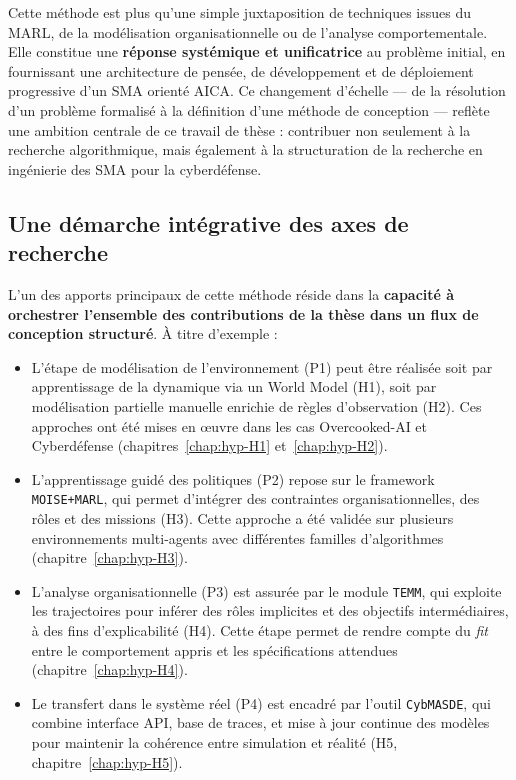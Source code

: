 \documentclass[ twoside,openright,titlepage,numbers=noenddot,headinclude,%
                footinclude=true,cleardoublepage=empty,abstractoff, %
                BCOR=5mm,paper=a4,fontsize=11pt,%
                french,american,%
                ]{scrreprt}
\begin{document}
Cette méthode est plus qu'une simple juxtaposition de techniques issues du MARL, de la modélisation organisationnelle ou de l'analyse comportementale. Elle constitue une \textbf{réponse systémique et unificatrice} au problème initial, en fournissant une architecture de pensée, de développement et de déploiement progressive d'un SMA orienté AICA. Ce changement d'échelle — de la résolution d'un problème formalisé à la définition d'une méthode de conception — reflète une ambition centrale de ce travail de thèse : contribuer non seulement à la recherche algorithmique, mais également à la structuration de la recherche en ingénierie des SMA pour la cyberdéfense.

\subsection{Une démarche intégrative des axes de recherche}
L'un des apports principaux de cette méthode réside dans la \textbf{capacité à orchestrer l'ensemble des contributions de la thèse dans un flux de conception structuré}. À titre d'exemple :

\begin{itemize}
    \item L'étape de modélisation de l'environnement (P1) peut être réalisée soit par apprentissage de la dynamique via un World Model (H1), soit par modélisation partielle manuelle enrichie de règles d'observation (H2). Ces approches ont été mises en œuvre dans les cas Overcooked-AI et Cyberdéfense (chapitres~\ref{chap:hyp-H1} et~\ref{chap:hyp-H2}).

    \item L'apprentissage guidé des politiques (P2) repose sur le framework \texttt{MOISE+MARL}, qui permet d'intégrer des contraintes organisationnelles, des rôles et des missions (H3). Cette approche a été validée sur plusieurs environnements multi-agents avec différentes familles d'algorithmes (chapitre~\ref{chap:hyp-H3}).

    \item L'analyse organisationnelle (P3) est assurée par le module \texttt{TEMM}, qui exploite les trajectoires pour inférer des rôles implicites et des objectifs intermédiaires, à des fins d'explicabilité (H4). Cette étape permet de rendre compte du \textit{fit} entre le comportement appris et les spécifications attendues (chapitre~\ref{chap:hyp-H4}).

    \item Le transfert dans le système réel (P4) est encadré par l'outil \texttt{CybMASDE}, qui combine interface API, base de traces, et mise à jour continue des modèles pour maintenir la cohérence entre simulation et réalité (H5, chapitre~\ref{chap:hyp-H5}).
\end{itemize}
\end{document}
